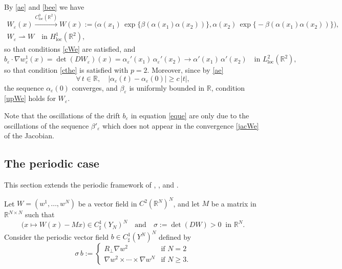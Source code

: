 \documentclass[JEP,XML,SOM,Unicode]{cedram}
\newcommand{\loc}{\mathrm{loc}}
\let\al\alpha
\let \be \beta
\def \RR {\mathbb R}
\theoremstyle{plain}
\theoremstyle{definition}
\begin{document}
By \eqref{ae} and \eqref{bee} we have
\begin{gather*}
 W_\varepsilon(x)\xrightarrow{C^0_\loc(\RR^2)}W(x)\!:=\!\bigl(\al(x_1)\,\exp\big\{\be(\al(x_1)\al(x_2))\big\},\al(x_2)\,\exp\big\{\!-\!\be(\al(x_1)\al(x_2))\big\}\bigr),
\\
W_\varepsilon\rightharpoonup W \quad\mbox{in }H^1_\loc(\RR^2),
\end{gather*}
so that conditions \eqref{cWe} are satisfied, and
\begin{equation}\label{jacWe}
b_\varepsilon\cdot\nabla w_\varepsilon^1(x)=\det(DW_\varepsilon)(x)=\al_\varepsilon'(x_1)\,\al_\varepsilon'(x_2)\to \al'(x_1)\,\al'(x_2)\quad\mbox{in }L^2_\loc(\RR^2),
\end{equation}
so that condition \eqref{cthe} is satisfied with $p=2$.
Moreover, since by \eqref{ae}
\[
\forall\,t\in\RR,\quad |\al_\varepsilon(t)-\al_\varepsilon(0)|\geq c\,|t|,
\]
the sequence $\al_\varepsilon(0)$ converges, and $\be_\varepsilon$ is uniformly bounded in $\RR$, condition \eqref{upWe} holds for $W_\varepsilon$.

Note that the oscillations of the drift $b_\varepsilon$ in equation \eqref{eque} are only due to the oscillations of the sequence $\be'_\varepsilon$ which does not appear in the convergence \eqref{jacWe} of the Jacobian.

\subsection{The periodic case}\label{ss.per}
This section extends the periodic framework of \cite{Bre,HoXi,Tas}, \cite[Th.\,8]{Gol1}, and \cite[Cor.\,4.4]{Bri}.

Let $W=(w^1,\dots,w^N)$ be a vector field in $C^2(\RR^N)^N$, and let $M$ be a matrix in $\RR^{N\times N}$ such that
\begin{equation}\label{siW}
\big(x\mapsto W(x)-Mx\big)\in C^1_\sharp(Y_N)^N\quad\mbox{and}\quad \sigma:=\det(DW)>0\;\;\mbox{in }\RR^N.
\end{equation}
Consider the periodic vector field $b\in C^1_\sharp(Y^N)^N$ defined by
\begin{equation}\label{sib}
\sigma\,b:=\begin{cases}
R_\perp\nabla w^2 & \mbox{if }N=2
\\[3pt]
\nabla w^2\times\cdots\times \nabla w^N & \mbox{if }N\geq 3.
\end{cases}
\end{equation}
\end{document}
